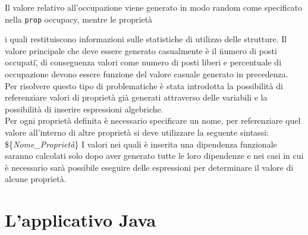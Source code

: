 \documentclass[12pt,a4paper,italian]{article}
\begin{document}

Il valore relativo all'occupazione viene generato in modo random come
specificato nella \texttt{prop} occupacy, mentre le proprietà  

i quali restituiscono informazioni sulle statistiche di utilizzo delle strutture. Il valore principale che deve essere 
generato casualmente è il \"numero di posti occupati\", di conseguenza valori come numero di posti liberi e percentuale di occupazione devono essere funzione del valore
casuale generato in precedenza.\\
Per risolvere questo tipo di problematiche è stata introdotta la possibilità di referenziare valori di proprietà già generati attraverso delle variabili e la possibilità di 
inserire espressioni algebriche.\\
Per ogni proprietà definita è necessario specificare un nome, per referenziare quel valore all'interno di altre proprietà si deve utilizzare la seguente sintassi: \$\{\emph{Nome\_Proprietà}\}
I valori nei quali è inserita una dipendenza funzionale saranno calcolati solo dopo aver generato tutte le loro dipendenze e nei casi in cui è necessario sarà possibile eseguire delle espressioni 
per determinare il valore di alcune proprietà.
\newpage
\section{L'applicativo Java}
\end{document}
